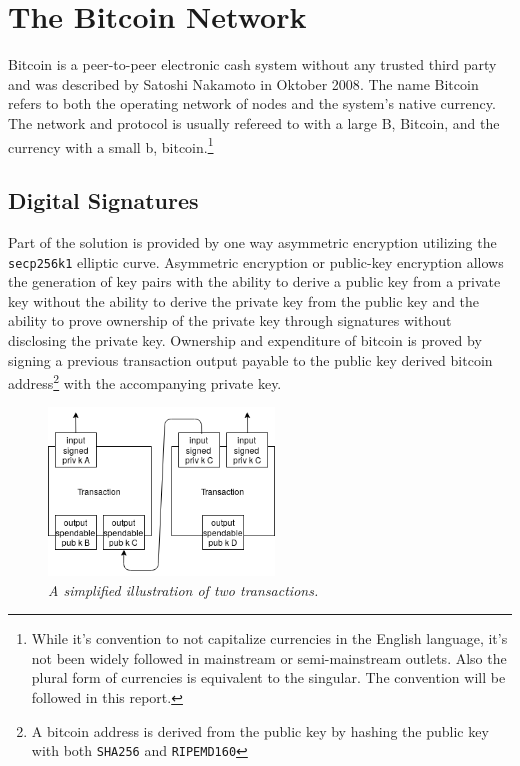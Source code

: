 \chapter{The Bitcoin Network}
	\label{sec:bitcoin}

Bitcoin is a peer-to-peer electronic cash system without any trusted third party and was described by Satoshi Nakamoto in Oktober 2008\cite{nakamoto:bitcoin}. The name Bitcoin refers to both the operating network of nodes and the system's native currency. The network and protocol is usually refereed to with a large B, Bitcoin, and the currency with a small b, bitcoin.\footnote{While it's convention to not capitalize currencies in the English language, it's not been widely followed in mainstream or semi-mainstream outlets. Also the plural form of currencies is equivalent to the singular. The convention will be followed in this report.}

\section{Digital Signatures}

Part of the solution is provided by one way asymmetric encryption utilizing the \texttt{secp256k1} elliptic curve. Asymmetric encryption or public-key encryption allows the generation of key pairs with the ability to derive a public key from a private key without the ability to derive the private key from the public key and the ability to prove ownership of the private key through signatures without disclosing the private key. Ownership and expenditure of bitcoin is proved by signing a previous transaction output payable to the public key derived bitcoin address\footnote{A bitcoin address is derived from the public key by hashing the public key with both \texttt{SHA256} and \texttt{RIPEMD160}} with the accompanying private key. 

\begin{figure}[!htb]

	\centering
	\includegraphics[width=6cm]{images/transaction.png}
	\caption{\textit{A simplified illustration of two transactions. 
	}}
	\label{fig:two:tx}

\end{figure}

